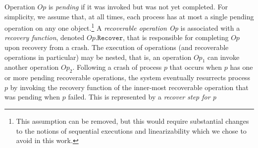 Operation $Op$ is \emph{pending} if it was invoked but was not yet completed. For simplicity, we assume that, at all times, each process has at most a single pending operation on any one object.\footnote{This assumption can be removed, but this would require substantial changes to the notions of sequential executions and linearizability which we chose to avoid in this work.}
A \emph{recoverable operation Op} is associated with a \emph{recovery function}, denoted $Op.\texttt{Recover}$, that is responsible for completing $Op$ upon recovery from a crash. The execution of operations (and recoverable operations in particular) may be nested, that is, an operation $Op_1$ can invoke another operation $Op_2$. %
Following a crash of process $p$ that occurs when $p$ has one or more pending recoverable operations, the system eventually resurrects process $p$ by invoking the recovery function of the inner-most recoverable operation that was pending when $p$ failed. This is represented by a \emph{recover step for p}


